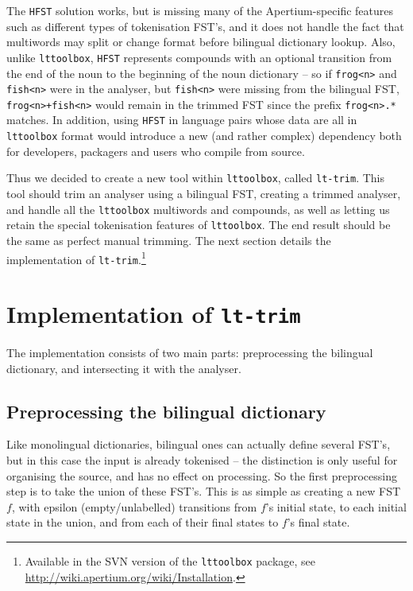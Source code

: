 \documentclass[10pt, a4paper]{article}
\newcommand{\ana}[1]{\texttt{#1}}
\newcommand{\tool}[1]{\texttt{#1}}
\begin{document}
The \tool{HFST} solution works, but is missing many of the
Apertium-specific features such as different types of tokenisation
FST's, and it does not handle the fact that multiwords may split or
change format before bilingual dictionary lookup. Also, unlike
\tool{lttoolbox}, \tool{HFST} represents compounds with an optional
transition from the end of the noun to the beginning of the noun
dictionary -- so if \ana{frog<n>} and \ana{fish<n>} were in the
analyser, but \ana{fish<n>} were missing from the bilingual FST,
\ana{frog<n>+fish<n>} would remain in the trimmed FST since the prefix
\ana{frog<n>.*} matches. In addition, using \tool{HFST} in language
pairs whose data are all in \tool{lttoolbox} format would introduce a
new (and rather complex) dependency both for developers, packagers and
users who compile from source.

Thus we decided to create a new tool within \tool{lttoolbox}, called
\tool{lt-trim}. This tool should trim an analyser using a bilingual
FST, creating a trimmed analyser, and handle all the \tool{lttoolbox}
multiwords and compounds, as well as letting us retain the special
tokenisation features of \tool{lttoolbox}. The end result should be
the same as perfect manual trimming. The next section details  the
implementation of \tool{lt-trim}.\footnote{Available in the SVN
version of the \tool{lttoolbox} package, see
\href{http://wiki.apertium.org/wiki/Installation}{http://wiki.apertium.org/wiki/Installation}.}


\section{Implementation of \tool{lt-trim}}

The implementation consists of two main parts: preprocessing the
bilingual dictionary, and intersecting it with the analyser. 


\subsection{Preprocessing the bilingual dictionary}

Like monolingual dictionaries, bilingual ones can actually define
several FST's, but in this case the input is already tokenised -- the
distinction is only useful for organising the source, and has no
effect on processing. So the first preprocessing step is to take the
union of these FST's. This is as simple as creating a new FST $f$,
with epsilon (empty/unlabelled) transitions from $f$'s initial state,
to each initial state in the union, and from each of their final
states to $f$'s final state.
\end{document}
